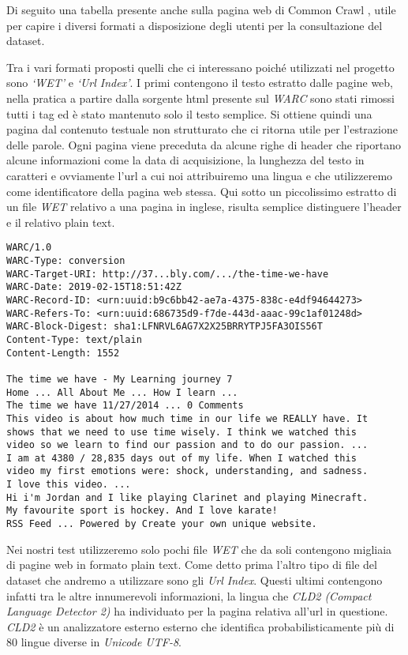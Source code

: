 \documentclass{article}
\newcommand{\CC}{Common Crawl }
\begin{document}
Di seguito una tabella presente anche sulla pagina web di \CC, utile per capire i diversi formati a disposizione degli utenti per la consultazione del dataset.

\commonCrawlFilesTable

Tra i vari formati proposti quelli che ci interessano poiché utilizzati nel progetto sono \textit{`WET'} e \textit{`Url Index'}. I primi contengono il testo estratto dalle pagine web, nella pratica a partire dalla sorgente html presente sul \textit{WARC} sono stati rimossi tutti i tag ed è stato mantenuto solo il testo semplice. Si ottiene quindi una pagina dal contenuto testuale non strutturato che ci ritorna utile per l'estrazione delle parole. Ogni pagina viene preceduta da alcune righe di header che riportano alcune informazioni come la data di acquisizione, la lunghezza del testo in caratteri e ovviamente l'url a cui noi attribuiremo una lingua e che utilizzeremo come identificatore della pagina web stessa. Qui sotto un piccolissimo estratto di un file \textit{WET} relativo a una pagina in inglese, risulta semplice distinguere l'header e il relativo plain text.

\begin{verbatim}
WARC/1.0
WARC-Type: conversion
WARC-Target-URI: http://37...bly.com/.../the-time-we-have
WARC-Date: 2019-02-15T18:51:42Z
WARC-Record-ID: <urn:uuid:b9c6bb42-ae7a-4375-838c-e4df94644273>
WARC-Refers-To: <urn:uuid:686735d9-f7de-443d-aaac-99c1af01248d>
WARC-Block-Digest: sha1:LFNRVL6AG7X2X25BRRYTPJ5FA3OIS56T
Content-Type: text/plain
Content-Length: 1552

The time we have - My Learning journey 7
Home ... All About Me ... How I learn ...
The time we have 11/27/2014 ... 0 Comments
This video is about how much time in our life we REALLY have. It 
shows that we need to use time wisely. I think we watched this 
video so we learn to find our passion and to do our passion. ...
I am at 4380 / 28,835 days out of my life. When I watched this 
video my first emotions were: shock, understanding, and sadness. 
I love this video. ...
Hi i'm Jordan and I like playing Clarinet and playing Minecraft. 
My favourite sport is hockey. And I love karate!
RSS Feed ... Powered by Create your own unique website.
\end{verbatim}

Nei nostri test utilizzeremo solo pochi file \textit{WET} che da soli contengono migliaia di pagine web in formato plain text. Come detto prima l'altro tipo di file del dataset che andremo a utilizzare sono gli \textit{Url Index}. Questi ultimi contengono infatti tra le altre innumerevoli informazioni, la lingua che  \textit{CLD2 (Compact Language Detector 2)} ha individuato per la pagina relativa all'url in questione. \textit{CLD2} è un analizzatore esterno esterno che identifica probabilisticamente più di 80 lingue diverse in \textit{Unicode UTF-8}.
\end{document}
